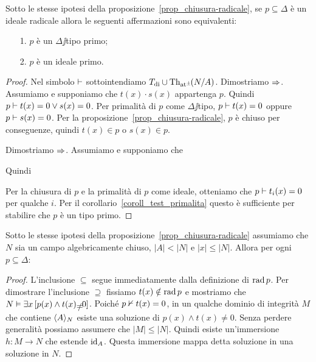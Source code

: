 \begin{proposition}\label{prop_tipi_e_ideali_primi}
Sotto le stesse ipotesi della proposizione~\ref{prop_chiusura-radicale}, se $p\subseteq\Delta$ \`e un ideale radicale allora le seguenti affermazioni sono equivalenti:
\begin{itemize}
\item[1.] $p$ \`e un $\Delta\jj$tipo primo;
\item[2.] $p$ \`e un ideale primo.
\end{itemize}
\end{proposition}

\begin{proof}
Nel simbolo $\vdash$ sottointendiamo $T_{\rm di}\cup\textrm{Th}_{{\tiny\rm at^\pm}}\hskip-.3ex(N/A)$.  Dimostriamo $\Rightarrow$. Assumiamo  e supponiamo che $t(x)\cdot s(x)$ appartenga $p$. Quindi $p\vdash t(x)=0\vee s(x)=0$. Per primalit\`a di $p$ come $\Delta\jj$tipo,  $p\vdash t(x)=0$ oppure $p\vdash s(x)=0$. Per la proposizione~\ref{prop_chiusura-radicale}, $p$ \`e chiuso per conseguenze, quindi $t(x)\in p$ o $s(x)\in p$.

Dimostriamo $\Rightarrow$. Assumiamo  e supponiamo che


Quindi 


Per la chiusura di $p$ e la primalit\`a di $p$ come ideale, otteniamo che $p\vdash t_i(x)=0$ per qualche $i$. Per il corollario~\ref{coroll_test_primalita} questo \`e sufficiente per stabilire che $p$ \`e un tipo primo.
\end{proof}



\begin{proposition}
Sotto le stesse ipotesi della proposizione~\ref{prop_chiusura-radicale} assumiamo che $N$ sia un campo algebricamente chiuso, $|A|<|N|$ e $|x|\le |N|$. Allora per ogni $p\subseteq\Delta$:



\end{proposition}

\begin{proof}
L'inclusione $\subseteq$ segue immediatamente dalla definizione di $\mathop{\rm rad} p$. Per dimostrare l'inclusione $\supseteq$ fissiamo $t(x)\notin\mathop{\rm rad} p$ e mostriamo che $N\models\E x\,[ p(x)\wedge t(x)\neq0]$. Poich\'e  $p\nvdash t(x)=0$, in un qualche dominio di integrit\`a $M$ che contiene $\langle A\rangle_N$ esiste una soluzione di $p(x)\wedge t(x)\neq0$. Senza perdere generalit\`a possiamo assumere che $|M|\le|N|$. Quindi esiste un'immersione $h:M\to N$ che estende $\textrm{id}_A$. Questa immersione mappa detta soluzione in una soluzione in $N$.
\end{proof}

